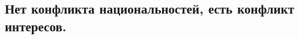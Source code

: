  
 
 
 
 
 
\subsection{Нет конфликта национальностей, есть конфликт интересов.}
\label{sec:27_11_2020.fb.1.zharkih_denis_konflikt_interesov}
